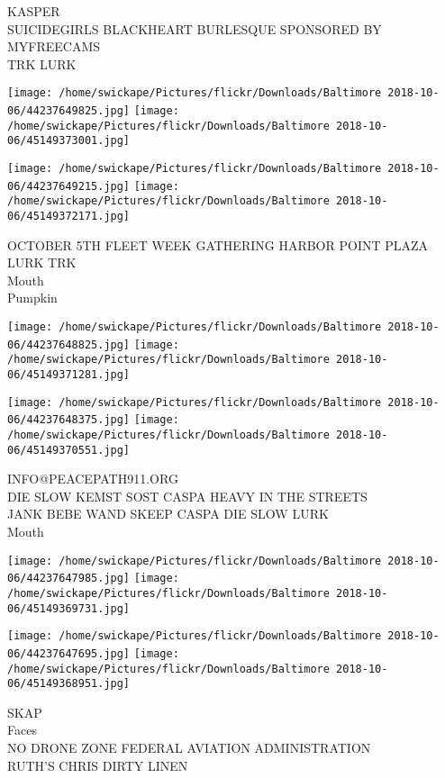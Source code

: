 \documentclass[10pt,letterpaper]{article}
\begin{document}
KASPER\\
SUICIDEGIRLS BLACKHEART BURLESQUE SPONSORED BY MYFREECAMS\\
TRK LURK\\
\pagebreak

\texttt{[image: /home/swickape/Pictures/flickr/Downloads/Baltimore 2018-10-06/44237649825.jpg]}
\texttt{[image: /home/swickape/Pictures/flickr/Downloads/Baltimore 2018-10-06/45149373001.jpg]}

\texttt{[image: /home/swickape/Pictures/flickr/Downloads/Baltimore 2018-10-06/44237649215.jpg]}
\texttt{[image: /home/swickape/Pictures/flickr/Downloads/Baltimore 2018-10-06/45149372171.jpg]}

OCTOBER 5TH FLEET WEEK GATHERING HARBOR POINT PLAZA\\
LURK TRK\\
Mouth\\
Pumpkin\\
\pagebreak

\texttt{[image: /home/swickape/Pictures/flickr/Downloads/Baltimore 2018-10-06/44237648825.jpg]}
\texttt{[image: /home/swickape/Pictures/flickr/Downloads/Baltimore 2018-10-06/45149371281.jpg]}

\texttt{[image: /home/swickape/Pictures/flickr/Downloads/Baltimore 2018-10-06/44237648375.jpg]}
\texttt{[image: /home/swickape/Pictures/flickr/Downloads/Baltimore 2018-10-06/45149370551.jpg]}

INFO@PEACEPATH911.ORG\\
DIE SLOW KEMST SOST CASPA HEAVY IN THE STREETS\\
JANK BEBE WAND SKEEP CASPA DIE SLOW LURK\\
Mouth\\
\pagebreak

\texttt{[image: /home/swickape/Pictures/flickr/Downloads/Baltimore 2018-10-06/44237647985.jpg]}
\texttt{[image: /home/swickape/Pictures/flickr/Downloads/Baltimore 2018-10-06/45149369731.jpg]}

\texttt{[image: /home/swickape/Pictures/flickr/Downloads/Baltimore 2018-10-06/44237647695.jpg]}
\texttt{[image: /home/swickape/Pictures/flickr/Downloads/Baltimore 2018-10-06/45149368951.jpg]}

SKAP\\
Faces\\
NO DRONE ZONE FEDERAL AVIATION ADMINISTRATION\\
RUTH'S CHRIS DIRTY LINEN\\
\pagebreak
\end{document}
